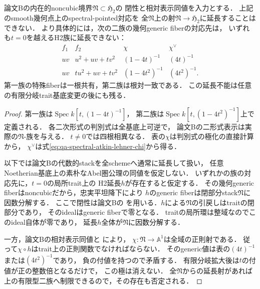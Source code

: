 \begin{corollary}
\label{cor:qa-spectral-involution-no-h2-extension}
論文Bの内在的noncubic境界$\mathfrak N\subset\mathfrak H_2$の
閉性と相対表示同値を入力とする．
上記のsmooth幾何点上のspectral-pointed対応を
全$\mathfrak N$上の射$\mathfrak N\to\mathfrak H_2$に延長することはできない．
より具体的には，次の二族の幾何generic fiberの対応先は，
いずれも$t=0$を越えるH2族に延長できない：
\[
\begin{array}{c|c|c|c}
f_1&f_2&\chi&\chi^\vee\\\hline
uv&u^2+uv+t v^2&(1-4t)^{-1}&(4t)^{-1}\\
uv&t u^2+uv+t v^2&(1-4t^2)^{-1}&(4t^2)^{-1}.
\end{array}
\]
第一族の特殊fiberは一根共有，第二族は根対一致である．
この延長不能は任意の有限分岐trait基底変更の後にも残る．
\end{corollary}
\begin{proof}
第一族は$\operatorname{Spec}k[t,(1-4t)^{-1}]$，
第二族は$\operatorname{Spec}k[t,(1-4t^2)^{-1}]$上で定義される．
各二次形式の判別式は全基底上可逆で，
論文Bの二形式表示は実際の$\mathfrak N$-族を与える．
$t\ne0$では四根相異なる．
表の$\chi$は判別式の極化の直接計算から，
$\chi^\vee$は式\eqref{eq:qa-spectral-atkin-lehner-chi}から得る．

以下では論文Bの代数的stackを全schemeへ通常に延長して扱い，
任意Noetherian基底上の素朴なAbel圏公理の同値を仮定しない．
いずれかの族の対応先に，$t=0$の局所trait上の
H2延長$h$が存在すると仮定する．
その幾何generic fiberはnoncubicだから，忠実平坦降下により
$h$のgeneric fiberは閉部分stack$\mathfrak N$に因数分解する．
ここで閉性は論文Bの
\cite[\texttt{thm:noncubic-boundary-smooth-codim-two}]{QuadricModuli2026}
を用いる．$h$による$\mathfrak N$の引戻しはtraitの閉部分であり，
そのidealはgeneric fiberで零となる．
traitの局所環は整域なのでこのideal自体が零であり，
延長$h$全体が$\mathfrak N$に因数分解する．

一方，論文Bの相対表示同値と
\cite[\texttt{prop:noncubic-good-moduli}]{QuadricModuli2026}により，
$\chi:\mathfrak N\to\mathbb A^1$は全域の正則射である．
従って$\chi\circ h$はtrait上の正則関数でなければならない．
そのgeneric値は表の$(4t)^{-1}$または$(4t^2)^{-1}$であり，
負の付値を持つので矛盾する．
有限分岐拡大後は$t$の付値が正の整数倍となるだけで，
この極は消えない．
全$\mathfrak N$からの延長射があれば
上の有限型二族へ制限できるので，その存在も否定される．
\end{proof}

